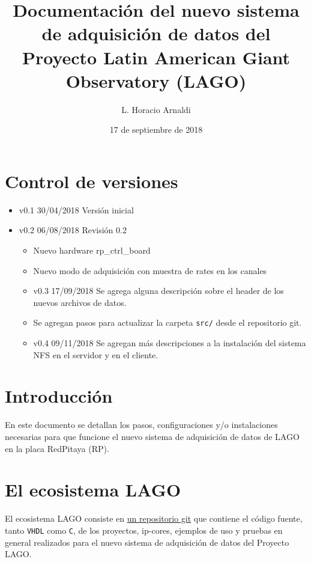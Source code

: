 \documentclass[a4paper,11pt]{article}
\begin{document}
\author{L. Horacio Arnaldi}
\title{Documentación del nuevo sistema de adquisición de datos del Proyecto
Latin American Giant Observatory (LAGO)}
\date{17 de septiembre de 2018}
\maketitle
\tableofcontents

\section{Control de versiones}
\begin{itemize}
\item v0.1 30/04/2018 Versión inicial
\item v0.2 06/08/2018 Revisión 0.2
\begin{itemize}
\item Nuevo hardware rp\_ctrl\_board
\item Nuevo modo de adquisición con muestra de rates en los canales
\end{itemize}
\begin{itemize}
\item v0.3 17/09/2018 Se agrega alguna descripción sobre el header de los nuevos archivos de
				datos.
\item Se agregan pasos para actualizar la carpeta \texttt{src/} desde el
				repositorio git.
\end{itemize}
\begin{itemize}
\item v0.4 09/11/2018 Se agregan más descripciones a la instalación del sistema
				NFS en el servidor y en el cliente.
\end{itemize}
\end{itemize}

\section{Introducción}
En este documento se detallan los pasos, configuraciones y/o instalaciones
necesarias para que funcione el nuevo sistema de adquisición de datos de LAGO en
la placa RedPitaya (RP).

\section{El ecosistema LAGO}
El ecosistema LAGO consiste en
\href{https://github.com/lagoprojectrp/lago\_ecosystem}{un repositorio git} que
contiene el código fuente, tanto \texttt{VHDL} como \texttt{C}, de los proyectos,
ip-cores, ejemplos de uso y pruebas en general realizados para el nuevo sistema de
adquisición de datos del Proyecto LAGO. 
\end{document}

